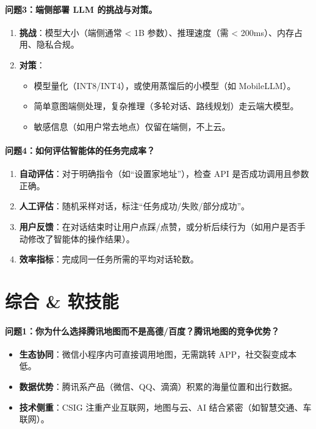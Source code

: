 \documentclass[12pt,a4paper]{article}
\begin{document}
\paragraph{问题3：端侧部署 LLM 的挑战与对策。}
\begin{enumerate}[label=(\arabic*)]
\item \textbf{挑战}：模型大小（端侧通常 < 1B 参数）、推理速度（需 < 200ms）、内存占用、隐私合规。
\item \textbf{对策}：
\begin{itemize}
  \item 模型量化（INT8/INT4），或使用蒸馏后的小模型（如 MobileLLM）。
  \item 简单意图端侧处理，复杂推理（多轮对话、路线规划）走云端大模型。
  \item 敏感信息（如用户常去地点）仅留在端侧，不上云。
\end{itemize}
\end{enumerate}

\paragraph{问题4：如何评估智能体的任务完成率？}
\begin{enumerate}[label=(\arabic*)]
\item \textbf{自动评估}：对于明确指令（如“设置家地址”），检查 API 是否成功调用且参数正确。
\item \textbf{人工评估}：随机采样对话，标注“任务成功/失败/部分成功”。
\item \textbf{用户反馈}：在对话结束时让用户点踩/点赞，或分析后续行为（如用户是否手动修改了智能体的操作结果）。
\item \textbf{效率指标}：完成同一任务所需的平均对话轮数。
\end{enumerate}

\section{综合 \& 软技能}

\paragraph{问题1：你为什么选择腾讯地图而不是高德/百度？腾讯地图的竞争优势？}
\begin{itemize}
\item \textbf{生态协同}：微信小程序内可直接调用地图，无需跳转 APP，社交裂变成本低。
\item \textbf{数据优势}：腾讯系产品（微信、QQ、滴滴）积累的海量位置和出行数据。
\item \textbf{技术侧重}：CSIG 注重产业互联网，地图与云、AI 结合紧密（如智慧交通、车联网）。
\end{itemize}
\end{document}
